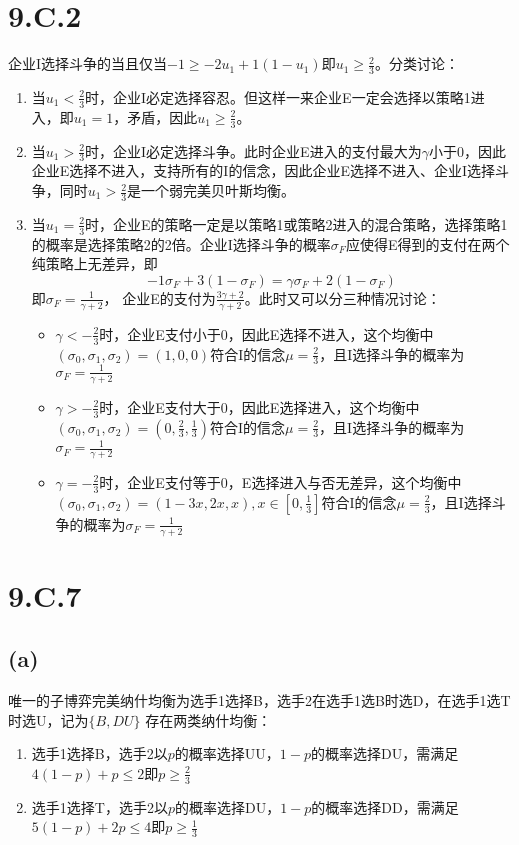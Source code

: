 \documentclass[a4paper,12pt]{ctexart}
\begin{document}
\section*{9.C.2}
企业I选择斗争的当且仅当$-1\ge-2u_1+1(1-u_1)$即$\displaystyle u_1\ge \frac{2}{3}$。分类讨论：
\begin{enumerate}
    \item 当$\displaystyle u_1<\frac{2}{3}$时，企业I必定选择容忍。但这样一来企业E一定会选择以策略1进入，即$u_1=1$，矛盾，因此$\displaystyle u_1\ge \frac{2}{3}$。
    \item 当$\displaystyle u_1>\frac{2}{3}$时，企业I必定选择斗争。此时企业E进入的支付最大为$\gamma$小于0，因此企业E选择不进入，支持所有的I的信念，因此企业E选择不进入、企业I选择斗争，同时$u_1>\frac{2}{3}$是一个弱完美贝叶斯均衡。
    \item 当$\displaystyle u_1=\frac{2}{3}$时，企业E的策略一定是以策略1或策略2进入的混合策略，选择策略1的概率是选择策略2的2倍。企业I选择斗争的概率$\sigma_F$应使得E得到的支付在两个纯策略上无差异，即$$-1\sigma_F+3(1-\sigma_F)=\gamma \sigma_F+2(1-\sigma_F)$$即$\displaystyle \sigma_F=\frac{1}{\gamma+2}$，
          企业E的支付为$\displaystyle \frac{3\gamma+2}{\gamma+2}$。此时又可以分三种情况讨论：
          \begin{itemize}
              \item $\gamma<-\frac{2}{3}$时，企业E支付小于0，因此E选择不进入，这个均衡中$(\sigma_0,\sigma_1,\sigma_2)=(1,0,0)$符合I的信念$\mu=\frac{2}{3}$，且I选择斗争的概率为$\sigma_F=\frac{1}{\gamma+2}$
              \item $\gamma>-\frac{2}{3}$时，企业E支付大于0，因此E选择进入，这个均衡中$(\sigma_0,\sigma_1,\sigma_2)=(0,\frac{2}{3},\frac{1}{3})$符合I的信念$\mu=\frac{2}{3}$，且I选择斗争的概率为$\sigma_F=\frac{1}{\gamma+2}$
              \item $\gamma=-\frac{2}{3}$时，企业E支付等于0，E选择进入与否无差异，这个均衡中$(\sigma_0,\sigma_1,\sigma_2)=(1-3x,2x,x),x\in[0,\frac{1}{3}]$符合I的信念$\mu=\frac{2}{3}$，且I选择斗争的概率为$\sigma_F=\frac{1}{\gamma+2}$
          \end{itemize}
\end{enumerate}
\section*{9.C.7}
\subsection*{(a)}
唯一的子博弈完美纳什均衡为选手1选择B，选手2在选手1选B时选D，在选手1选T时选U，记为$\{ B,DU \}$
存在两类纳什均衡：
\begin{enumerate}
    \item 选手1选择B，选手2以$p$的概率选择UU，$1-p$的概率选择DU，需满足$4(1-p)+p\le 2$即$p\ge \frac{2}{3}$
    \item 选手1选择T，选手2以$p$的概率选择DU，$1-p$的概率选择DD，需满足$5(1-p)+2p\le 4$即$p\ge \frac{1}{3}$
\end{enumerate}
\end{document}
